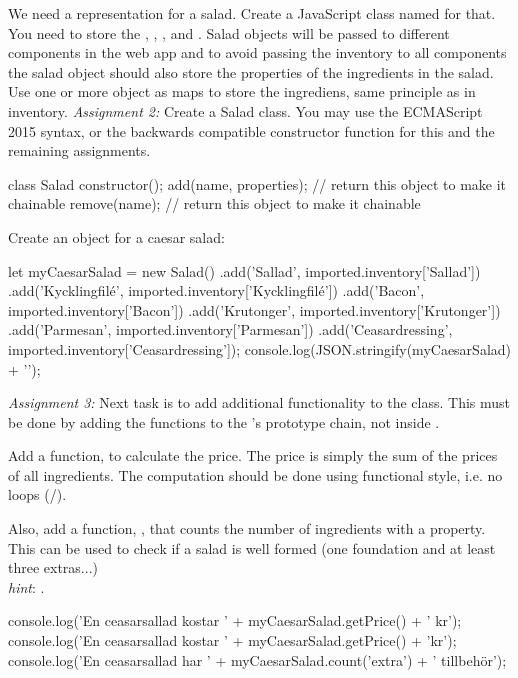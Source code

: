 \documentclass[fleqn, article, a4paper]{memoir}
\begin{document}
\begin{Assignments}
\item We need a representation for a salad. Create a JavaScript class named  for that. You need to store the , , , and . Salad objects will be passed to different components in the web app and to avoid passing the inventory to all components the salad object should also store the properties of the ingredients in the salad. Use one or more object as maps to store the ingrediens, same principle as in inventory. 
\emph{Assignment 2:} Create a Salad class. You may use the ECMAScript 2015  syntax, or the backwards compatible constructor function for this and the remaining assignments.
\begin{Code}
class Salad {
  constructor();
  add(name, properties);  // return this object to make it chainable
  remove(name);           // return this object to make it chainable
}
\end{Code}
Create an object for a caesar salad:
\begin{Code}
let myCaesarSalad = new Salad()
.add('Sallad', imported.inventory['Sallad'])
.add('Kycklingfilé', imported.inventory['Kycklingfilé'])
.add('Bacon', imported.inventory['Bacon'])
.add('Krutonger', imported.inventory['Krutonger'])
.add('Parmesan', imported.inventory['Parmesan'])
.add('Ceasardressing', imported.inventory['Ceasardressing']);
console.log(JSON.stringify(myCaesarSalad) + '\n');
\end{Code}
\item \emph{Assignment 3:} Next task is to add additional functionality to the  class. This must be done by adding the functions to the 's prototype chain, not inside .

Add a function,  to calculate the price. The price is simply the sum of the prices of all ingredients. The computation should be done using functional style, i.e. no loops (/). 

Also, add a function, , that counts the number of ingredients with a property. This can be used to check if a salad is well formed (one foundation and at least three extras...)
\\ \emph{hint}: .
\begin{Code}
console.log('En ceasarsallad kostar ' + myCaesarSalad.getPrice() + ' kr\n');
console.log('En ceasarsallad kostar ' + myCaesarSalad.getPrice() + 'kr');
console.log('En ceasarsallad har ' + myCaesarSalad.count('extra') + ' tillbehör');


\end{Code}
\end{Assignments}
\end{document}
